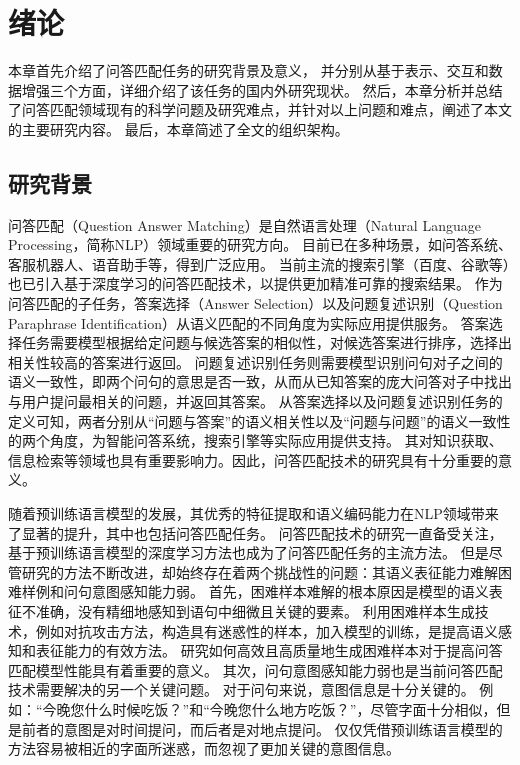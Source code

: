 \chapter{绪论}

本章首先介绍了问答匹配任务的研究背景及意义，
并分别从基于表示、交互和数据增强三个方面，详细介绍了该任务的国内外研究现状。
然后，本章分析并总结了问答匹配领域现有的科学问题及研究难点，并针对以上问题和难点，阐述了本文的主要研究内容。
最后，本章简述了全文的组织架构。

\section{研究背景}


问答匹配（Question Answer Matching）是自然语言处理（Natural Language Processing，简称NLP）领域重要的研究方向。
目前已在多种场景，如问答系统、客服机器人、语音助手等，得到广泛应用。
当前主流的搜索引擎（百度、谷歌等）也已引入基于深度学习的问答匹配技术，以提供更加精准可靠的搜索结果。
作为问答匹配的子任务，答案选择（Answer Selection）以及问题复述识别（Question Paraphrase Identification）从语义匹配的不同角度为实际应用提供服务。
答案选择任务需要模型根据给定问题与候选答案的相似性，对候选答案进行排序，选择出相关性较高的答案进行返回。
问题复述识别任务则需要模型识别问句对子之间的语义一致性，即两个问句的意思是否一致，从而从已知答案的庞大问答对子中找出与用户提问最相关的问题，并返回其答案。
从答案选择以及问题复述识别任务的定义可知，两者分别从“问题与答案”的语义相关性以及“问题与问题”的语义一致性的两个角度，为智能问答系统，搜索引擎等实际应用提供支持。
其对知识获取、信息检索等领域也具有重要影响力。因此，问答匹配技术的研究具有十分重要的意义。

随着预训练语言模型的发展，其优秀的特征提取和语义编码能力在NLP领域带来了显著的提升，其中也包括问答匹配任务。
问答匹配技术的研究一直备受关注，基于预训练语言模型的深度学习方法也成为了问答匹配任务的主流方法。
但是尽管研究的方法不断改进，却始终存在着两个挑战性的问题：其语义表征能力难解困难样例和问句意图感知能力弱。
首先，困难样本难解的根本原因是模型的语义表征不准确，没有精细地感知到语句中细微且关键的要素。
利用困难样本生成技术，例如对抗攻击方法，构造具有迷惑性的样本，加入模型的训练，是提高语义感知和表征能力的有效方法。
研究如何高效且高质量地生成困难样本对于提高问答匹配模型性能具有着重要的意义。
其次，问句意图感知能力弱也是当前问答匹配技术需要解决的另一个关键问题。
对于问句来说，意图信息是十分关键的。
例如：“今晚您什么时候吃饭？”和“今晚您什么地方吃饭？”，尽管字面十分相似，但是前者的意图是对时间提问，而后者是对地点提问。
仅仅凭借预训练语言模型的方法容易被相近的字面所迷惑，而忽视了更加关键的意图信息。


